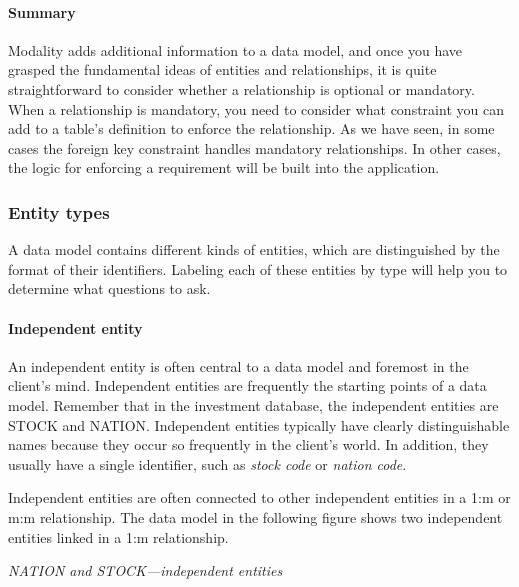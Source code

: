 \documentclass[
]{article}
\begin{document}
\hypertarget{summary-6}{%
\paragraph*{Summary}\label{summary-6}}

Modality adds additional information to a data model, and once you have
grasped the fundamental ideas of entities and relationships, it is quite
straightforward to consider whether a relationship is optional or
mandatory. When a relationship is mandatory, you need to consider what
constraint you can add to a table's definition to enforce the
relationship. As we have seen, in some cases the foreign key constraint
handles mandatory relationships. In other cases, the logic for enforcing
a requirement will be built into the application.

\hypertarget{entity-types}{%
\subsubsection*{Entity types}\label{entity-types}}

A data model contains different kinds of entities, which are
distinguished by the format of their identifiers. Labeling each of these
entities by type will help you to determine what questions to ask.

\hypertarget{independent-entity}{%
\paragraph*{Independent entity}\label{independent-entity}}

An independent entity is often central to a data model and foremost in
the client's mind. Independent entities are frequently the starting
points of a data model. Remember that in the investment database, the
independent entities are STOCK and NATION. Independent entities
typically have clearly distinguishable names because they occur so
frequently in the client's world. In addition, they usually have a
single identifier, such as \emph{stock code} or \emph{nation code}.

Independent entities are often connected to other independent entities
in a 1:m or m:m relationship. The data model in the following figure
shows two independent entities linked in a 1:m relationship.

\emph{NATION and STOCK---independent entities}
\end{document}
